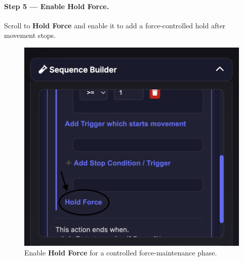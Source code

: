 \documentclass[
    twocolumn,
    fontsize = 10pt,
    parskip = half+,
    headings = small,
    headwidth = text,
    footwidth = text,
]{scrartcl}
\begin{document}
\paragraph{\textbf{Step 5 — Enable Hold Force.}}
Scroll to \textbf{Hold Force} and enable it to add a force-controlled hold after movement stops.
\begin{figure}[htbp]\centering
  \includegraphics[width=.9\linewidth]{pics/sb-4.png}
  \caption{Enable \textbf{Hold Force} for a controlled force-maintenance phase.}
  \label{fig:sb-4}
\end{figure}
\end{document}
